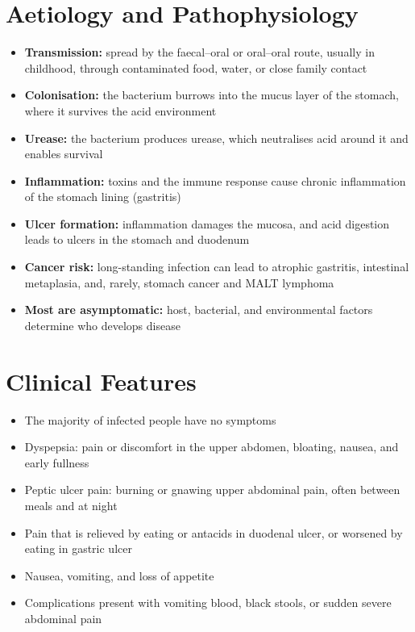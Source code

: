 \section*{Aetiology and Pathophysiology}
\begin{itemize}
    \item \textbf{Transmission:} spread by the faecal--oral or oral--oral route, usually in childhood, through contaminated food, water, or close family contact
    \item \textbf{Colonisation:} the bacterium burrows into the mucus layer of the stomach, where it survives the acid environment
    \item \textbf{Urease:} the bacterium produces urease, which neutralises acid around it and enables survival
    \item \textbf{Inflammation:} toxins and the immune response cause chronic inflammation of the stomach lining (gastritis)
    \item \textbf{Ulcer formation:} inflammation damages the mucosa, and acid digestion leads to ulcers in the stomach and duodenum
    \item \textbf{Cancer risk:} long-standing infection can lead to atrophic gastritis, intestinal metaplasia, and, rarely, stomach cancer and MALT lymphoma
    \item \textbf{Most are asymptomatic:} host, bacterial, and environmental factors determine who develops disease
\end{itemize}

\section*{Clinical Features}
\begin{itemize}
    \item The majority of infected people have no symptoms
    \item Dyspepsia: pain or discomfort in the upper abdomen, bloating, nausea, and early fullness
    \item Peptic ulcer pain: burning or gnawing upper abdominal pain, often between meals and at night
    \item Pain that is relieved by eating or antacids in duodenal ulcer, or worsened by eating in gastric ulcer
    \item Nausea, vomiting, and loss of appetite
    \item Complications present with vomiting blood, black stools, or sudden severe abdominal pain
\end{itemize}

